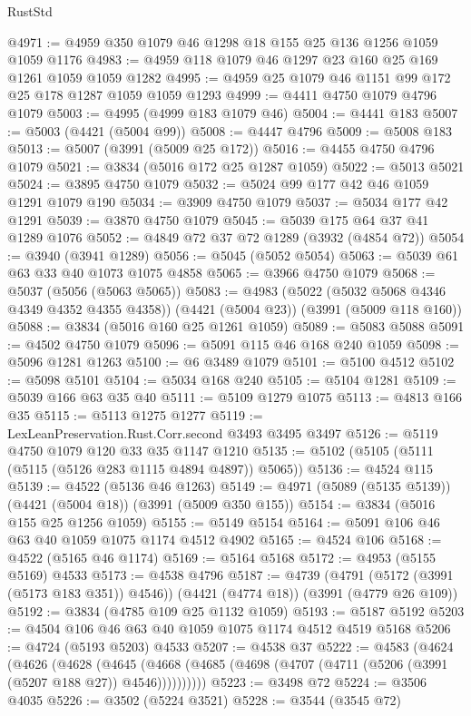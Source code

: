 \begin{lexlean}{RustStd}
\begin{coremodule}
@4971 := @4959 @350 @1079 @46 @1298 @18 @155 @25 @136 @1256 @1059 @1059 @1176
@4983 := @4959 @118 @1079 @46 @1297 @23 @160 @25 @169 @1261 @1059 @1059 @1282
@4995 := @4959 @25 @1079 @46 @1151 @99 @172 @25 @178 @1287 @1059 @1059 @1293
@4999 := @4411 @4750 @1079 @4796 @1079
@5003 := @4995 (@4999 @183 @1079 @46)
@5004 := @4441 @183
@5007 := @5003 (@4421 (@5004 @99))
@5008 := @4447 @4796
@5009 := @5008 @183
@5013 := @5007 (@3991 (@5009 @25 @172))
@5016 := @4455 @4750 @4796 @1079
@5021 := @3834 (@5016 @172 @25 @1287 @1059)
@5022 := @5013 @5021
@5024 := @3895 @4750 @1079
@5032 := @5024 @99 @177 @42 @46 @1059 @1291 @1079 @190
@5034 := @3909 @4750 @1079
@5037 := @5034 @177 @42 @1291
@5039 := @3870 @4750 @1079
@5045 := @5039 @175 @64 @37 @41 @1289 @1076
@5052 := @4849 @72 @37 @72 @1289 (@3932 (@4854 @72))
@5054 := @3940 (@3941 @1289)
@5056 := @5045 (@5052 @5054)
@5063 := @5039 @61 @63 @33 @40 @1073 @1075 @4858
@5065 := @3966 @4750 @1079
@5068 := @5037 (@5056 (@5063 @5065))
@5083 := @4983
    (@5022 (@5032 @5068 @4346 @4349 @4352 @4355 @4358))
    (@4421 (@5004 @23))
    (@3991 (@5009 @118 @160))
@5088 := @3834 (@5016 @160 @25 @1261 @1059)
@5089 := @5083 @5088
@5091 := @4502 @4750 @1079
@5096 := @5091 @115 @46 @168 @240 @1059
@5098 := @5096 @1281 @1263
@5100 := @6 @3489 @1079
@5101 := @5100 @4512
@5102 := @5098 @5101
@5104 := @5034 @168 @240
@5105 := @5104 @1281
@5109 := @5039 @166 @63 @35 @40
@5111 := @5109 @1279 @1075
@5113 := @4813 @166 @35
@5115 := @5113 @1275 @1277
@5119 := LexLeanPreservation.Rust.Corr.second @3493 @3495 @3497
@5126 := @5119 @4750 @1079 @120 @33 @35 @1147 @1210
@5135 := @5102 (@5105 (@5111 (@5115 (@5126 @283 @1115 @4894 @4897)) @5065))
@5136 := @4524 @115
@5139 := @4522 (@5136 @46 @1263)
@5149 := @4971 (@5089 (@5135 @5139)) (@4421 (@5004 @18)) (@3991 (@5009 @350 @155))
@5154 := @3834 (@5016 @155 @25 @1256 @1059)
@5155 := @5149 @5154
@5164 := @5091 @106 @46 @63 @40 @1059 @1075 @1174 @4512 @4902
@5165 := @4524 @106
@5168 := @4522 (@5165 @46 @1174)
@5169 := @5164 @5168
@5172 := @4953 (@5155 @5169) @4533
@5173 := @4538 @4796
@5187 := @4739
    (@4791 (@5172 (@3991 (@5173 @183 @351)) @4546))
    (@4421 (@4774 @18))
    (@3991 (@4779 @26 @109))
@5192 := @3834 (@4785 @109 @25 @1132 @1059)
@5193 := @5187 @5192
@5203 := @4504 @106 @46 @63 @40 @1059 @1075 @1174 @4512 @4519 @5168
@5206 := @4724 (@5193 @5203) @4533
@5207 := @4538 @37
@5222 := @4583
    (@4624
      (@4626
        (@4628
          (@4645 (@4668 (@4685 (@4698 (@4707 (@4711 (@5206 (@3991 (@5207 @188 @27)) @4546))))))))))
@5223 := @3498 @72
@5224 := @3506 @4035
@5226 := @3502 (@5224 @3521)
@5228 := @3544 (@3545 @72)

\end{coremodule}
\end{lexlean}
